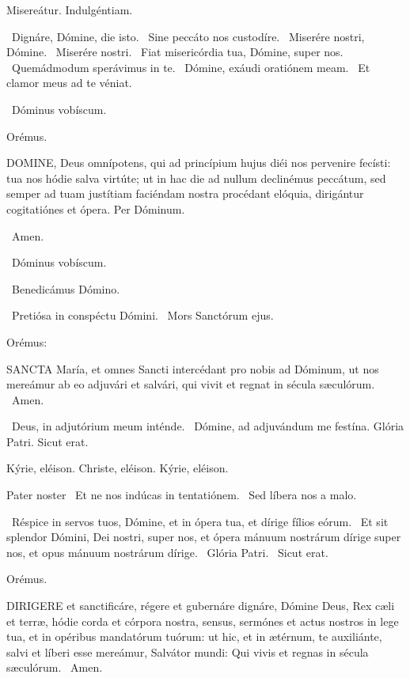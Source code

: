  Misereátur. Indulgéntiam.

\V\ Dignáre, Dómine, die isto. \R\ Sine peccáto nos custodíre. \V\ Miserére nostri, Dómine. \R\ Miserére nostri. \V\ Fiat misericórdia tua, Dómine, super nos. \R\ Quemádmodum sperávimus in te. \V\ Dómine, exáudi oratiónem meam. \R\ Et clamor meus ad te véniat.

\sectionornament

\V\ Dóminus vobíscum.

Orémus. 

\lettrine[lines=2]{D}{OMINE}, Deus omnípotens, qui ad princípium hujus diéi nos pervenire fecísti: tua nos hódie salva virtúte; ut in hac die ad nullum declinémus peccátum, sed semper ad tuam justítiam faciéndam nostra procédant elóquia, dirigántur cogitatiónes et ópera. Per Dóminum.

\R\ Amen.

\V\ Dóminus vobíscum.

\V\ Benedicámus Dómino.


\V\ Pretiósa in conspéctu Dómini. \R\ Mors Sanctórum ejus.

 Orémus:


\lettrine[lines=2]{S}{ANCTA} María, et omnes Sancti intercédant pro nobis ad Dóminum, ut nos mereámur ab eo adjuvári et salvári, qui vivit et regnat in sécula sæculórum. \R\ Amen.

\V\ Deus, in adjutórium meum inténde. \R\ Dómine, ad adjuvándum me festína.  Glória Patri. Sicut erat.

Kýrie, eléison. Christe, eléison. Kýrie, eléison.

Pater noster  \V\ Et ne nos indúcas in tentatiónem. \R\ Sed líbera nos a malo.

\V\ Réspice in servos tuos, Dómine, et in ópera tua, et dírige fílios eórum. \R\ Et sit splendor Dómini, Dei nostri, super nos, et ópera mánuum nostrárum dírige super nos, et opus mánuum nostrárum dírige. \V\ Glória Patri. \R\ Sicut erat.

Orémus. 

\lettrine[lines=2]{D}{IRIGERE} et sanctificáre, régere et gubernáre dignáre, Dómine Deus, Rex cæli et terræ, hódie corda et córpora nostra, sensus, sermónes et actus nostros in lege tua, et in opéribus mandatórum tuórum: ut hic, et in ætérnum, te auxiliánte, salvi et líberi esse mereámur, Salvátor mundi: Qui vivis et regnas in sécula sæculórum. \R\ Amen.

